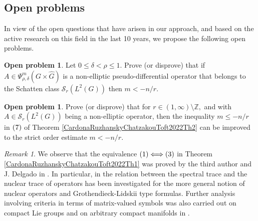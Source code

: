 \documentclass[12pt, reqno]{amsart}
\theoremstyle{definition}
\newtheorem{openproblem}[theorem]{Open problem}
\theoremstyle{remark}
\newtheorem{remark}[theorem]{Remark}
\numberwithin{equation}{section}
\begin{document}
\subsection{Open problems}
In view of the open questions that have arisen in our approach, and based on the active research on this field in the last 10 years, we propose the following open problems.
\begin{openproblem} Let $0\leq \delta<\rho\leq 1.$ Prove (or disprove) that if  $A\in \Psi^m_{\rho,\delta}(G\times \widehat{G})$ is a non-elliptic pseudo-differential operator that belongs to the Schatten class  $ \mathscr{S}_{r}(L^2(G))$ then $m<-n/r.$
\end{openproblem}
\begin{openproblem}Prove (or disprove) that for  $r\in (1,\infty)\setminus \mathbb{Z},$ and with  $A\in \mathscr{S}_{r}(L^2(G))$ being a non-elliptic operator, then the inequality $m\leq -n/r$ in  $\textnormal{(7)}$ of Theorem \ref{CardonaRuzhanskyChatzakouToft2022Th2} can be improved to the strict order estimate $m<-n/r.$    
\end{openproblem}
\begin{remark}We observe that the equivalence $\textnormal{(1)}\Longleftrightarrow \textnormal{(3)} $ in Theorem \ref{CardonaRuzhanskyChatzakouToft2022Th1} was proved by the third author and J. Delgado in \cite{DelgadoRuzhansky2021}.     In particular, in \cite{DelgadoRuzhansky2014} the relation between the spectral trace and the nuclear trace of operators has been investigated for the more general notion of nuclear operators and Grothendieck-Lidskii type formulas.  Further analysis involving criteria in terms of matrix-valued symbols  was also carried out  on compact Lie groups and on arbitrary compact manifolds in  \cite{CardonaRuzhanksySubellipticCalculus,DelgadoRuzhansky2014,DelRuzTrace1111,DelRuzTrace111,DelgadoRuzhanskyWang,DelgadoRuzhanskyWang2,DelgadoRuzhanskyTokmagambetov2017,DelRuzTrace11,DelgadoRuzhansky2018MS,DelRuzTrace1,DelgadoRuzhansky2021}.
\end{remark}
\end{document}

